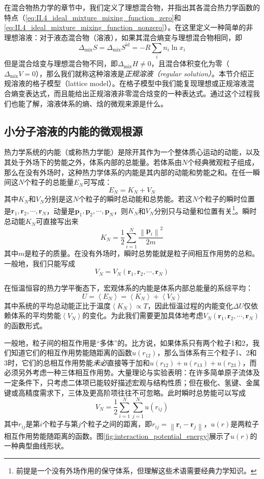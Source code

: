 \documentclass[main.tex]{subfiles}
\begin{document}
在混合物热力学的章节中，我们定义了理想混合物，并指出其各混合热力学函数的特点（\eqref{eq:II.4_ideal_mixture_mixing_function_zero}和\eqref{eq:II.4_ideal_mixture_mixing_function_nonzero}）。在这里定义一种简单的非理想溶液：对于液态混合物（溶液），如果其混合熵变与理想混合物相同，即
\[\Delta_\text{mix}S=\Delta_\text{mix}S^\text{id}=-R\sum_in_i\ln x_i\]
但是混合焓变与理想混合物不同，即$\Delta_\text{mix}H\neq 0$，且混合体积变化为零（$\Delta_\text{mix}V=0$），那么我们就称这种溶液是\emph{正规溶液（regular solution）}。本节介绍正规溶液的格子模型（lattice model）。在格子模型中我们能复现理想或正规溶液混合熵变表达式，而且能给出正规溶液非零混合焓变的一种表达式。通过这个过程我们也能了解，溶液体系的熵、焓的微观来源是什么。

\subsection{小分子溶液的内能的微观根源}\label{sec:III.1.1_internal_energy_micro_origin}
热力学系统的内能（或称热力学能）是除开其作为一个整体质心运动的动能，以及其处于外场下的势能之外，体系内部的总能量。若体系由$N$个经典微观粒子组成，那么在没有外场时，这种热力学体系的内能是其内部的动能和势能之和。在任一瞬间这$N$个粒子的总能量$E_N$可写成：
\[E_N=K_N+V_N\]
其中$K_N$和$V_N$分别是这$N$个粒子的瞬时总动能和总势能。若这$N$个粒子的瞬时位置是$\mathbf{r}_1,\mathbf{r}_2,\cdots,\mathbf{r}_N$，动量是$\mathbf{p}_1,\mathbf{p}_2,\cdots,\mathbf{p}_N$，则$K_N$和$V_N$分别只与动量和位置有关\footnote{前提是一个没有外场作用的保守体系，但理解这些术语需要经典力学知识。}。瞬时总动能$K_N$可直接写出来
\[K_N=\frac{1}{2}\sum_{i=1}^N\frac{\left\|\mathbf{p}_i\right\|^2}{2 m}\]
其中$m$是粒子的质量。在没有外场时，瞬时总势能就是粒子间相互作用势的总和。一般地，我们只能写成
\[V_N=V_N\left(\mathbf{r}_1,\mathbf{r}_2,\cdots,\mathbf{r}_N\right)\]

在恒温恒容的热力学平衡态下，宏观体系的内能是体系内部总能量的系综平均：
\[U=\left\langle E_N\right\rangle=\left\langle K_N\right\rangle+\left\langle V_N\right\rangle\]
其中系统的平均总动能正比于温度$\left\langle K_N\right\rangle\propto T$，因此恒温过程的内能变化$\Delta U$仅依赖体系的平均势能$\left\langle V_N\right\rangle$的变化。为此我们需要更加具体地考虑$V_N\left(\mathbf{r}_1,\mathbf{r}_2,\cdots,\mathbf{r}_N\right)$的函数形式。

一般地，粒子间的相互作用是“多体”的。比方说，如果体系只有两个粒子1和2，我们知道它们的相互作用势能随距离的函数$u\left(r_{12}\right)$，那么当体系有三个粒子1、2和3时，它们的总相互作用势能\emph{未必}直接等于加和$u\left(r_{12}\right)+u\left(r_{13}\right)+u\left(r_{23}\right)$，而必须另外考虑一种三体相互作用势。大量理论与实验表明：在许多简单原子流体及一定条件下，只考虑二体项已能较好描述宏观与结构性质；但在极化、氢键、金属键或高精度需求下，三体及更高阶项往往不可忽略。此时瞬时总势能可以写成
\[V_N=\frac{1}{2}\sum_{i=1}^N\sum_{j=1}^N u\left(r_{ij}\right)\]
其中$r_{ij}$是第$i$个粒子与第$j$个粒子之间的距离，即$r_{ij}=\left\|\mathbf{r}_i-\mathbf{r}_j\right\|$，$u\left(r\right)$是两粒子相互作用势能随距离的函数。图\ref{fig:interaction_potential_energy}展示了$u\left(r\right)$的一种典型曲线形状。
\end{document}
